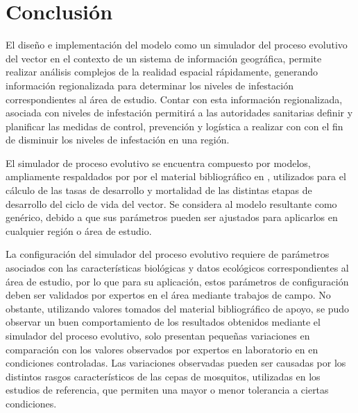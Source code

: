 \section{Conclusión}
El diseño e implementación del modelo como un simulador del proceso evolutivo del vector en el
contexto de un  sistema de información geográfica, permite realizar análisis complejos de la
realidad espacial rápidamente, generando información regionalizada para determinar los niveles de
infestación correspondientes al área de estudio. Contar con esta información regionalizada,
asociada con niveles de infestación permitirá a las autoridades sanitarias definir y planificar
las medidas de control, prevención y logística a realizar con con el fin de disminuir los niveles
de infestación en una región.

El simulador de proceso evolutivo se encuentra compuesto por modelos, ampliamente respaldados por
por el material bibliográfico en \cite{sharpe1977reaction, focks1993dynamic, schoolfield1981non, otero2006stochastic, rueda1990temperature}, utilizados para el cálculo de las tasas de desarrollo
y mortalidad de las distintas etapas de desarrollo del ciclo de vida del vector. Se considera al
modelo resultante como genérico, debido a que sus parámetros pueden ser ajustados para aplicarlos
en cualquier región o área de estudio.

La configuración del simulador del proceso evolutivo requiere de parámetros asociados con las
características biológicas y datos ecológicos correspondientes al área de estudio, por lo que para
su aplicación, estos parámetros de configuración deben ser validados por expertos en el área
mediante trabajos de campo. No obstante, utilizando valores tomados del material bibliográfico de
apoyo, se pudo observar un buen comportamiento de los resultados obtenidos mediante el simulador
del proceso evolutivo, solo presentan pequeñas variaciones en comparación con los valores
observados por expertos en laboratorio en en condiciones controladas. Las variaciones observadas
pueden ser causadas por los distintos rasgos característicos de las cepas de mosquitos, utilizadas
en los estudios de referencia, que permiten una mayor o menor tolerancia a ciertas condiciones.
